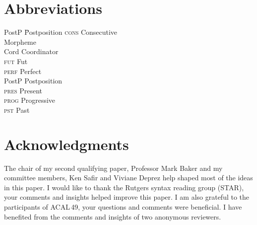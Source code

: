 \documentclass[output=paper,colorlinks,citecolor=brown]{langscibook}
\begin{document}
\section*{Abbreviations}
\begin{multicols}{3}
\begin{tabbing}
PostP\hspace{.5ex} \= Postposition\kill
\textsc{cons}  \> Consecutive \\ \> Morpheme  \\
Cord  \> Coordinator \\
\textsc{fut}  \> Fut \\
\textsc{perf}  \> Perfect \\
PostP \> Postposition  \\
\textsc{pres}  \> Present  \\
\textsc{prog}  \> Progressive \\
\textsc{pst}  \> Past
\end{tabbing}
\end{multicols}

\section*{Acknowledgments}
The chair of my second qualifying paper, Professor Mark Baker and my committee members, Ken Safir and Viviane Deprez help shaped most of the ideas in this paper. I would like to thank the Rutgers syntax reading group (STAR), your comments and insights helped improve this paper. I am also grateful to the participants of ACAL\,49, your questions and comments were beneficial. I have benefited from the comments and insights of two anonymous reviewers.

{\sloppy\printbibliography[heading=subbibliography,notkeyword=this]}
\end{document}
